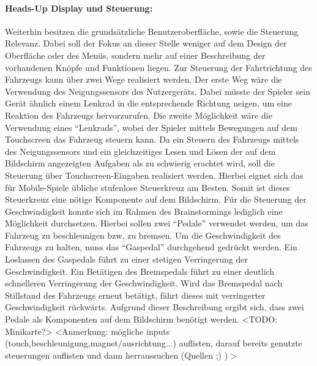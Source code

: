 		\paragraph{Heads-Up Display und Steuerung:}
		Weiterhin besitzen die grundsätzliche Benutzeroberfläche, sowie die Steuerung Relevanz. Dabei soll der Fokus an dieser Stelle weniger auf dem Design der Oberfläche oder des Menüs, sondern mehr auf einer Beschreibung der vorhandenen Knöpfe und Funktionen liegen.
		Zur Steuerung der Fahrtrichtung des Fahrzeugs kann über zwei Wege realisiert werden. Der erste Weg wäre die Verwendung des Neigungssensors des Nutzergeräts. Dabei müsste der Spieler sein Gerät ähnlich einem Lenkrad in die entsprechende Richtung neigen, um eine Reaktion des Fahrzeugs hervorzurufen. Die zweite Möglichkeit wäre die Verwendung eines \enquote{Lenkrads}, wobei der Spieler mittels Bewegungen auf dem Touchscreen das Fahrzeug steuern kann. Da ein Steuern des Fahrzeugs mittels des Neigungssensors und ein gleichzeitiges Lesen und Lösen der auf dem Bildschirm angezeigten Aufgaben als zu schwierig erachtet wird, soll die Steuerung über Touchscreen-Eingaben realisiert werden. Hierbei eignet sich das für Mobile-Spiele übliche stufenlose Steuerkreuz am Besten. Somit ist dieses Steuerkreuz eine nötige Komponente auf dem Bildschirm.
		Für die Steuerung der Geschwindigkeit konnte sich im Rahmen des Brainstormings lediglich eine Möglichkeit durchsetzen. Hierbei sollen zwei \enquote{Pedale} verwendet werden, um das Fahrzeug zu beschleunigen bzw. zu bremsen. Um die Geschwindigkeit des Fahrzeugs zu halten, muss das \enquote{Gaspedal} durchgehend gedrückt werden. Ein Loslassen des Gaspedals führt zu einer stetigen Verringerung der Geschwindigkeit. Ein Betätigen des Bremspedals führt zu einer deutlich schnelleren Verringerung der Geschwindigkeit. Wird das Bremspedal nach Stillstand des Fahrzeugs erneut betätigt, fährt dieses mit verringerter Geschwindigkeit rückwärts. Aufgrund dieser Beschreibung ergibt sich, dass zwei Pedale als Komponenten auf dem Bildschirm benötigt werden.
		<TODO: Minikarte?>
		<Anmerkung: mögliche inputs (touch,beschleunigung,magnet/ausrichtung...) auflisten, darauf bereits genutzte steuerungen auflisten und dann herraussuchen (Quellen ;) ) >

